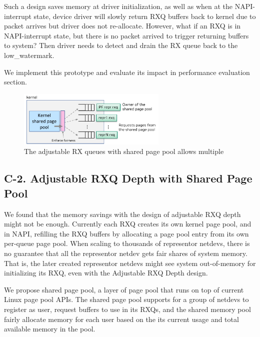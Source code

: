 \documentclass[letterpaper]{article}
\begin{document}
Such a design saves memory at driver initialization, as well as when at
the NAPI-interrupt state, device driver will slowly return RXQ buffers back
to kernel due to packet arrives but driver does not re-allocate.
However, what if an RXQ is in NAPI-interrupt state, but there is no packet
arrived to trigger returning buffers to system? Then driver needs to detect
and drain the RX queue back to the low\_watermark.

We implement this prototype and evaluate its impact in performance evaluation section.

\begin{figure}[t!]
\includegraphics[width=2.8in]{shared_page_pool.pdf}
\centering
\caption{The adjustable RX queues with shared page pool allows multiple}
\label{fig:shared_page_pool}
\end{figure}

\subsection{C-2. Adjustable RXQ Depth with Shared Page Pool}
We found that the memory savings with the design of adjustable RXQ depth
might not be enough.
Currently each RXQ creates its own kernel page pool, and in NAPI, refilling
the RXQ buffers by allocating a page pool entry from its own per-queue page pool.
When scaling to thousands of representor netdevs, there is no guarantee that
all the representor netdev gets fair shares of system memory. That is, the later
created representor netdevs might see system out-of-memory for initializing its RXQ,
even with the Adjustable RXQ Depth design.

We propose shared page pool, a layer of page pool that runs on top of current
Linux page pool APIs. The shared page pool supports for a group of netdevs
to register as user, request buffers to use in its RXQs, and the shared memory
pool fairly allocate memory for each user based on the its current usage and
total available memory in the pool.
\end{document}
